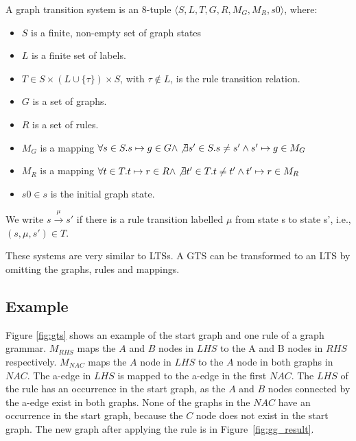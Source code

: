 \begin{definition}
A graph transition system is an 8-tuple	$\langle S, L, T, G, R, M_G, M_R, s0\rangle$, where:
\begin{itemize}
\item $S$ is a finite, non-empty set of graph states
\item $L$ is a finite set of labels.
\item $T \in S \times (L \cup \{\tau\}) \times S$, with $\tau \notin L$, is the rule transition relation.
\item $G$ is a set of graphs.
\item $R$ is a set of rules.
\item $M_G$ is a mapping $\forall s \in S . s \mapsto g \in G \land \not\exists s' \in S . s \neq s' \land s' \mapsto g \in M_G$
\item $M_R$ is a mapping $\forall t \in T . t \mapsto r \in R \land \not\exists t' \in T . t \neq t' \land t' \mapsto r \in M_R$
\item $s0 \in s$ is the initial graph state.
\end{itemize}
We write $s \xrightarrow{\mu}s'$ if there is a rule transition labelled $\mu$ from state s to state s', i.e., $(s, \mu, s') \in T$.
\end{definition}

These systems are very similar to LTSs. A GTS can be transformed to an LTS by omitting the graphs, rules and mappings.

\subsection{Example}\label{sec:gts_example}
Figure \ref{fig:gts} shows an example of the start graph and one rule of a graph grammar. $\mathit{M_{RHS}}$ maps the $A$ and $B$ nodes in $\mathit{LHS}$ to the A and B nodes in $\mathit{RHS}$ respectively. $\mathit{M_{NAC}}$ maps the $A$ node in $\mathit{LHS}$ to the $A$ node in both graphs in $\mathit{NAC}$. The a-edge in $\mathit{LHS}$ is mapped to the a-edge in the first $\mathit{NAC}$. The $\mathit{LHS}$ of the rule has an occurrence in the start graph, as the $A$ and $B$ nodes connected by the a-edge exist in both graphs. None of the graphs in the $\mathit{NAC}$ have an occurrence in the start graph, because the $C$ node does not exist in the start graph. The new graph after applying the rule is in Figure~\ref{fig:gg_result}.

